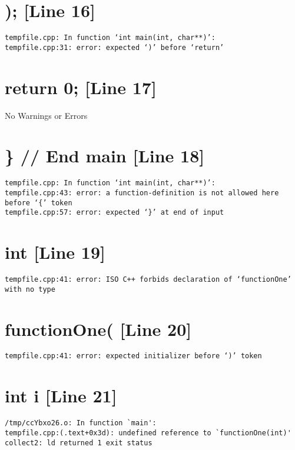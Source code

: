 \documentclass{article}
\begin{document}
\section{); [Line 16]}
\begin{verbatim}
tempfile.cpp: In function ‘int main(int, char**)’:
tempfile.cpp:31: error: expected ‘)’ before ‘return’

\end{verbatim}



\section{return 0; [Line 17]}
No Warnings or Errors



\section{\} // End main [Line 18]}
\begin{verbatim}
tempfile.cpp: In function ‘int main(int, char**)’:
tempfile.cpp:43: error: a function-definition is not allowed here before ‘{’ token
tempfile.cpp:57: error: expected ‘}’ at end of input

\end{verbatim}



\section{int [Line 19]}
\begin{verbatim}
tempfile.cpp:41: error: ISO C++ forbids declaration of ‘functionOne’ with no type

\end{verbatim}



\section{functionOne( [Line 20]}
\begin{verbatim}
tempfile.cpp:41: error: expected initializer before ‘)’ token

\end{verbatim}



\section{int i [Line 21]}
\begin{verbatim}
/tmp/ccYbxo26.o: In function `main':
tempfile.cpp:(.text+0x3d): undefined reference to `functionOne(int)'
collect2: ld returned 1 exit status

\end{verbatim}
\end{document}
